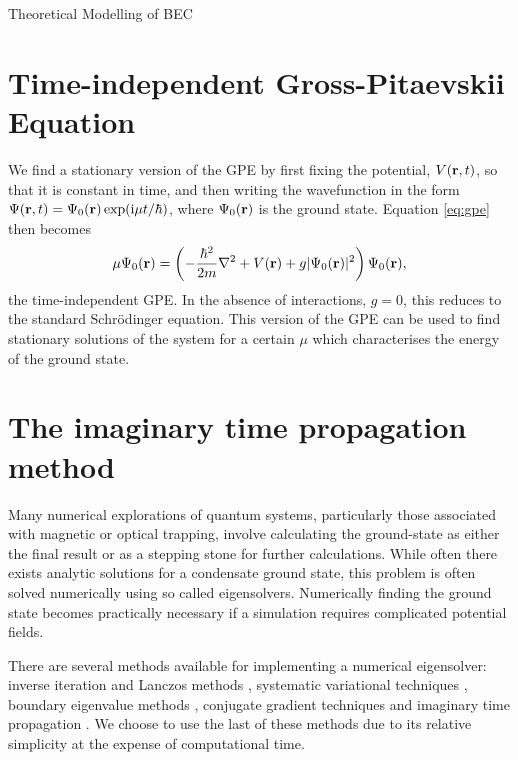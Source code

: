 \begin{chapter}{\label{cha:theoretical_model}Theoretical Modelling of BEC}
\section{\label{section:gpestationary} Time-independent Gross-Pitaevskii Equation}
 We find a stationary version of the GPE by first fixing the potential, $V({\bf r},t)$, so that it is constant in time, and then writing the wavefunction in the form $\Psi({\bf r},t) = \Psi_0({\bf r}) \exp (\mathrm{i}\mu t / \hbar)$, where $\Psi_0({\bf r})$ is the ground state. Equation \ref{eq:gpe} then becomes
	\begin{equation}\label{eq:stationgpe}
		\mu\Psi_0({\bf r}) = \left( -\frac{\hbar^2}{2m}\nabla^2 + V({\bf r}) + g|\Psi_0({\bf r})|^2  \right) \Psi_0({\bf r}),
	\end{equation}
	the time-independent GPE. In the absence of interactions, $g=0$, this reduces to the standard Schr\"odinger equation. This version of the GPE can be used to find stationary solutions of the system for a certain $\mu$ which characterises the energy of the ground state.
	
\section{\label{section:imagTime} The imaginary time propagation method}

	Many numerical explorations of quantum systems, particularly those associated with magnetic or optical trapping,  involve calculating the ground-state as either the final result or as a stepping stone for further calculations. While often there exists analytic solutions for a condensate ground state, this problem is often solved numerically using so called eigensolvers. Numerically finding the ground state becomes practically necessary if a simulation requires complicated potential fields.

	There are several methods available for implementing a numerical eigensolver: inverse iteration and Lanczos methods \cite{thijssen1999computational}, systematic variational techniques \cite{Bao2003230}, boundary eigenvalue methods \cite{Edwards95}, conjugate gradient techniques \cite{NumericalRecipes} and imaginary time propagation \cite{PhysRevE.62.7438}. We choose to use the last of these methods due to its relative simplicity at the expense of computational time.


\end{chapter}
